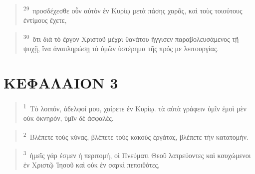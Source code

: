 \documentclass{article}
\newcommand{\currentverse}{1} %
\newcommand{\setcurrentverse}[1]{\renewcommand{\currentverse}{#1}}
\begin{document}
\begin{verse}

\setcurrentverse{29}

\setcounter{footnote}{0}

\textsuperscript{29}~προσδέχεσθε οὖν αὐτὸν ἐν Κυρίῳ μετὰ πάσης χαρᾶς, καὶ τοὺς τοιούτους ἐντίμους ἔχετε,

\end{verse}

\begin{verse}

\setcurrentverse{30}

\setcounter{footnote}{0}

\textsuperscript{30}~ὅτι διὰ τὸ ἔργον Χριστοῦ μέχρι θανάτου ἤγγισεν παραβολευσάμενος τῇ ψυχῇ, ἵνα ἀναπληρώσῃ τὸ ὑμῶν ὑστέρημα τῆς πρός με λειτουργίας.

\end{verse}

\section*{ΚΕΦΑΛΑΙΟΝ 3}

\begin{verse}

\setcurrentverse{1}

\setcounter{footnote}{0}

\textsuperscript{1}~Τὸ λοιπόν, ἀδελφοί μου, χαίρετε ἐν Κυρίῳ. τὰ αὐτὰ γράφειν ὑμῖν ἐμοὶ μὲν οὐκ ὀκνηρόν, ὑμῖν δὲ ἀσφαλές.

\end{verse}

\begin{verse}

\setcurrentverse{2}

\setcounter{footnote}{0}

\textsuperscript{2}~Βλέπετε τοὺς κύνας, βλέπετε τοὺς κακοὺς ἐργάτας, βλέπετε τὴν κατατομήν.

\end{verse}

\begin{verse}

\setcurrentverse{3}

\setcounter{footnote}{0}

\textsuperscript{3}~ἡμεῖς γάρ ἐσμεν ἡ περιτομή, οἱ Πνεύματι Θεοῦ λατρεύοντες καὶ καυχώμενοι ἐν Χριστῷ Ἰησοῦ καὶ οὐκ ἐν σαρκὶ πεποιθότες,

\end{verse}
\end{document}

